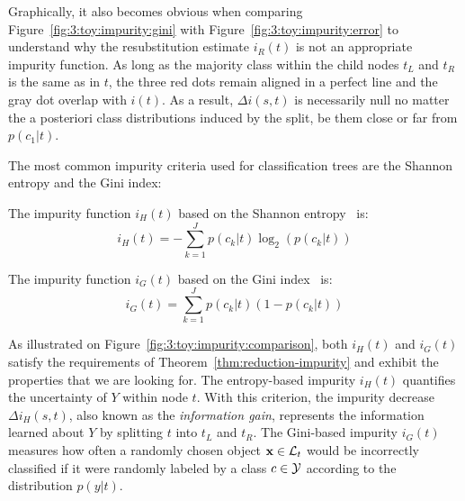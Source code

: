 Graphically, it also becomes obvious when comparing
Figure~\ref{fig:3:toy:impurity:gini} with Figure~\ref{fig:3:toy:impurity:error}
to understand why the resubstitution estimate $i_R(t)$ is not an appropriate
impurity function. As long as the majority class within the child nodes $t_L$
and $t_R$ is the same as in $t$, the three red dots remain aligned in a perfect
line and the gray dot overlap with $i(t)$. As a result, $\Delta i(s,t)$ is
necessarily null no matter the a posteriori class distributions induced by the
split, be them close or far from $p(c_1|t)$.

The most common impurity criteria used for classification trees are the Shannon
entropy and the Gini index:

\begin{definition}
The impurity function $i_H(t)$ based on the Shannon entropy~\citep{shannon:1949} is:
\begin{equation}\label{eqn:impurity:shannon}
i_H(t) = - \sum_{k=1}^J p(c_k|t) \log_2 (p(c_k|t))
\end{equation}
\end{definition}
\begin{definition}
The impurity function $i_G(t)$ based on the Gini index~\citep{gini:1912} is:
\begin{equation}\label{eqn:impurity:gini}
i_G(t) = \sum_{k=1}^J p(c_k|t) (1 - p(c_k|t))
\end{equation}
\end{definition}

As illustrated on Figure~\ref{fig:3:toy:impurity:comparison}, both $i_H(t)$ and
$i_G(t)$ satisfy the requirements of Theorem~\ref{thm:reduction-impurity} and
exhibit the properties that we are looking for. The entropy-based impurity
$i_H(t)$ quantifies the uncertainty of $Y$ within node $t$. With this
criterion, the impurity decrease $\Delta i_H(s,t)$, also known as the
\textit{information gain}, represents the information learned about
$Y$ by splitting $t$ into $t_L$ and $t_R$. The Gini-based impurity $i_G(t)$
measures how often a randomly chosen object $\mathbf{x}\in {\cal L}_t$ would be
incorrectly classified if it were randomly labeled by a class $c\in{\cal Y}$ according
to the distribution $p(y|t)$.

